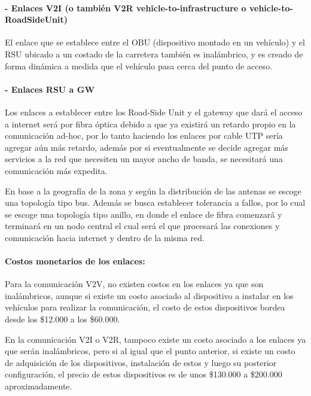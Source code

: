 \documentclass[12pt]{article}
\begin{document}
\paragraph{- Enlaces V2I (o también V2R vehicle-to-infrastructure o vehicle-to-RoadSideUnit)\\}
El enlace que se establece entre el OBU (dispositivo montado en un vehículo) y el RSU ubicado a un 
costado de la carretera también es inalámbrico, y es creado de forma dinámica a medida que el vehículo 
pasa cerca del punto de acceso.\\

\paragraph{- Enlaces RSU a GW\\}
Los enlaces a establecer entre los Road-Side Unit y el gateway que dará el acceso a internet será por 
fibra óptica debido a que ya existirá un retardo propio en la comunicación ad-hoc, por lo tanto haciendo
los enlaces por cable UTP sería agregar aún más retardo, además por si eventualmente se decide agregar 
más servicios a la red que necesiten un mayor ancho de banda, se necesitará una comunicación más 
expedita.

En base a la geografía de la zona y según la distribución de las antenas se escoge una topología tipo 
bus. Además se busca establecer tolerancia a fallos, por lo cual se escoge una topología tipo anillo, 
en donde el enlace de fibra comenzará y terminará en un nodo central el cual será el que procesará las 
conexiones y comunicación hacia internet y dentro de la misma red.
\paragraph{Costos monetarios de los enlaces:\\}
Para la comunicación V2V, no existen costos en los enlaces ya que son inalámbricos, aunque si 
existe un costo asociado al dispositivo a instalar en los vehículos para realizar la comunicación, el 
costo de estos dispositivos bordea desde los \$12.000 a los \$60.000.

En la comunicación V2I o V2R, tampoco existe un costo asociado a los enlaces ya que serán inalámbricos, 
pero si al igual que el punto anterior, si existe un costo de adquisición de los dispositivos, 
instalación de estos y luego su posterior configuración, el precio de estos dispositivos es de unos 
\$130.000 a \$200.000 aproximadamente.
\end{document}
